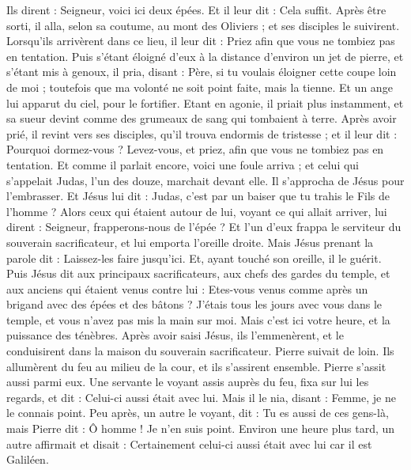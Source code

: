 \begin{multicols}{2}
Ils dirent : Seigneur, voici ici deux épées. Et il leur dit : Cela suffit.
\TextTitle{[Gethsémané]}
Après être sorti, il alla, selon sa coutume, au mont des Oliviers ; et ses disciples le suivirent.
Lorsqu’ils arrivèrent dans ce lieu, il leur dit : Priez afin que vous ne tombiez pas en tentation.
Puis s'étant éloigné d'eux à la distance d’environ un jet de pierre, et s'étant mis à genoux, il pria,
disant : Père, si tu voulais éloigner cette coupe loin de moi ; toutefois que ma volonté ne soit point faite, mais la tienne.
Et un ange lui apparut du ciel, pour le fortifier.
Etant en agonie, il priait plus instamment, et sa sueur devint comme des grumeaux de sang qui tombaient à terre.
Après avoir prié, il revint vers ses disciples, qu’il trouva endormis de tristesse ;
et il leur dit : Pourquoi dormez-vous ? Levez-vous, et priez, afin que vous ne tombiez pas en tentation.
Et comme il parlait encore, voici une foule arriva ; et celui qui s’appelait Judas, l'un des douze, marchait devant elle. Il s’approcha de Jésus pour l’embrasser.
Et Jésus lui dit : Judas, c’est par un baiser que tu trahis le Fils de l'homme ?
Alors ceux qui étaient autour de lui, voyant ce qui allait arriver, lui dirent : Seigneur, frapperons-nous de l'épée ?
Et l'un d'eux frappa le serviteur du souverain sacrificateur, et lui emporta l'oreille droite.
Mais Jésus prenant la parole dit : Laissez-les faire jusqu’ici. Et, ayant touché son oreille, il le guérit.
Puis Jésus dit aux principaux sacrificateurs, aux chefs des gardes du temple, et aux anciens qui étaient venus contre lui : Etes-vous venus comme après un brigand avec des épées et des bâtons ?
J’étais tous les jours avec vous dans le temple, et vous n'avez pas mis la main sur moi. Mais c'est ici votre heure, et la puissance des ténèbres.
Après avoir saisi Jésus, ils l'emmenèrent, et le conduisirent dans la maison du souverain sacrificateur. Pierre suivait de loin.
Ils allumèrent du feu au milieu de la cour, et ils s’assirent ensemble. Pierre s'assit aussi parmi eux.
Une servante le voyant assis auprès du feu, fixa sur lui les regards, et dit : Celui-ci aussi était avec lui.
Mais il le nia, disant : Femme, je ne le connais point.
Peu après, un autre le voyant, dit : Tu es aussi de ces gens-là, mais Pierre dit : Ô homme ! Je n'en suis point.
Environ une heure plus tard, un autre affirmait et disait : Certainement celui-ci aussi était avec lui car il est Galiléen.

\end{multicols}
